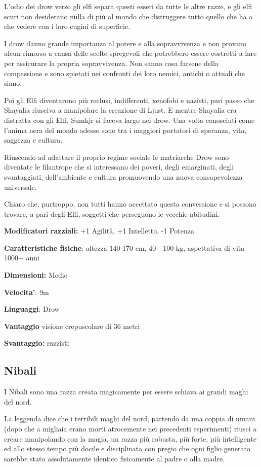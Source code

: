 \documentclass[a4paper,11pt,twoside,openany]{book}
\begin{document}
L'odio dei drow verso gli elfi separa questi esseri da tutte le altre razze, e gli elfi scuri non desiderano nulla di più al mondo che distruggere tutto quello che ha a che vedere con i loro cugini di superficie.

I drow danno grande importanza al potere e alla sopravvivenza e non provano alcun rimorso a causa delle scelte spregevoli che potrebbero essere costretti a fare per assicurare la propria sopravvivenza. Non sanno cosa farsene della compassione e sono spietati nei confronti dei loro nemici, antichi o attuali che siano.

Poi gli Elfi diventarono più reclusi, indifferenti, xenofobi e nazisti, pari passo che Shayalia riusciva a manipolare la creazione di Ljust. E mentre Shayalia era distratta con gli Elfi, Sumkjr si faceva largo nei drow. Una volta conosciuti come l'anima nera del mondo adesso sono tra i maggiori portatori di speranza, vita, saggezza e cultura.

Riuscendo ad adattare il proprio regime sociale le matriarche Drow sono diventate le filantrope che si interessano dei poveri, degli emarginati, degli svantaggiati, dell'ambiente e cultura promuovendo una nuova consapevolezza universale.

Chiaro che, purtroppo, non tutti hanno accettato questa conversione e si possono trovare, a pari degli Elfi, soggetti che perseguono le vecchie abitudini.

\textbf{Modificatori razziali:} +1 Agilità, +1 Intelletto, -1 Potenza

\textbf{Caratteristiche fisiche}: altezza 140-170 cm, 40 - 100 kg,
aspettativa di vita 1000+ anni

\textbf{Dimensioni:} Medie

\textbf{Velocita'}: 9m

\textbf{Linguaggi}: Drow

\textbf{Vantaggio} visione crepuscolare di 36 metri

\textbf{Svantaggio:} \sout{razzisti}

\subsection{Nibali}

\label{nibali}

I Nibali sono una razza creata magicamente per essere schiava ai grandi maghi del nord.

La leggenda dice che i terribili maghi del nord, partendo da una coppia di umani (dopo che a migliaia erano morti atrocemente nei precedenti esperimenti) riuscì a creare manipolando con la magia, un razza più robusta, più forte, più intelligente ed allo stesso tempo più docile e disciplinata con pregio che ogni figlio generato sarebbe stato assolutamente identico fisicamente al padre o alla madre.
\end{document}
